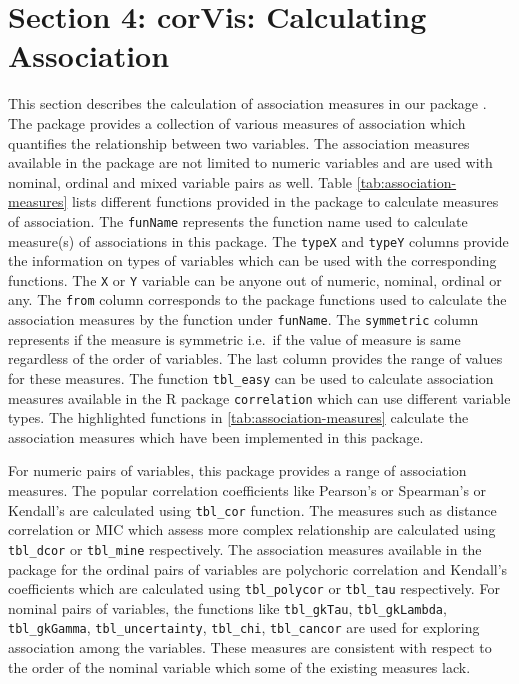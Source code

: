 \hypertarget{section-4-corvis-calculating-association}{%
\section{Section 4: corVis: Calculating
Association}\label{section-4-corvis-calculating-association}}

This section describes the calculation of association measures in our
package . The package provides a collection of various
measures of association which quantifies the relationship between two
variables. The association measures available in the package are not
limited to numeric variables and are used with nominal, ordinal and
mixed variable pairs as well. Table \ref{tab:association-measures} lists
different functions provided in the package to calculate measures of
association. The \texttt{funName} represents the function name used to
calculate measure(s) of associations in this package. The \texttt{typeX}
and \texttt{typeY} columns provide the information on types of variables
which can be used with the corresponding functions. The \texttt{X} or
\texttt{Y} variable can be anyone out of numeric, nominal, ordinal or
any. The \texttt{from} column corresponds to the package functions used
to calculate the association measures by the function under
\texttt{funName}. The \texttt{symmetric} column represents if the
measure is symmetric i.e.~if the value of measure is same regardless of
the order of variables. The last column provides the range of values for
these measures. The function \texttt{tbl\_easy} can be used to calculate
association measures available in the R package \texttt{correlation}
which can use different variable types. The highlighted functions in
\ref{tab:association-measures} calculate the association measures which
have been implemented in this package.

For numeric pairs of variables, this package provides a range of
association measures. The popular correlation coefficients like
Pearson's or Spearman's or Kendall's are calculated using
\texttt{tbl\_cor} function. The measures such as distance correlation or
MIC which assess more complex relationship are calculated using
\texttt{tbl\_dcor} or \texttt{tbl\_mine} respectively. The association
measures available in the package for the ordinal pairs of variables are
polychoric correlation and Kendall's coefficients which are calculated
using \texttt{tbl\_polycor} or \texttt{tbl\_tau} respectively. For
nominal pairs of variables, the functions like \texttt{tbl\_gkTau},
\texttt{tbl\_gkLambda}, \texttt{tbl\_gkGamma},
\texttt{tbl\_uncertainty}, \texttt{tbl\_chi}, \texttt{tbl\_cancor} are
used for exploring association among the variables. These measures are
consistent with respect to the order of the nominal variable which some
of the existing measures lack.

